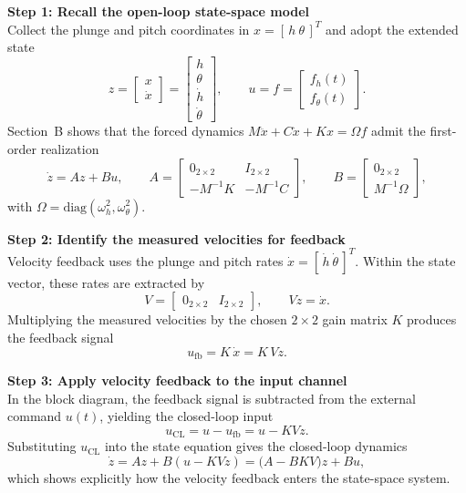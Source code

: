 \documentclass[12pt]{article}
\begin{document}
\begin{stepbox}
\textbf{Step 1: Recall the open-loop state-space model}\\[0.5em]
Collect the plunge and pitch coordinates in $x = [\,h \ \theta\,]^T$ and adopt the extended state
\[
z = \begin{bmatrix} x \\ \dot{x} \end{bmatrix}
= \begin{bmatrix} h \\ \theta \\ \dot{h} \\ \dot{\theta} \end{bmatrix},
\qquad
u = f = \begin{bmatrix} f_h(t) \\ f_\theta(t) \end{bmatrix}.
\]
Section~B shows that the forced dynamics $M\ddot{x}+C\dot{x}+Kx=\Omega f$ admit the first-order realization
\[
\dot{z} = A z + B u,
\qquad
A = \begin{bmatrix} 0_{2\times2} & I_{2\times2} \\ -M^{-1}K & -M^{-1}C \end{bmatrix},
\qquad
B = \begin{bmatrix} 0_{2\times2} \\ M^{-1}\Omega \end{bmatrix},
\]
with $\Omega = \mathrm{diag}(\omega_h^2,\omega_\theta^2)$.
\end{stepbox}

\begin{stepbox}
\textbf{Step 2: Identify the measured velocities for feedback}\\[0.5em]
Velocity feedback uses the plunge and pitch rates $\dot{x} = [\,\dot{h} \ \dot{\theta}\,]^T$.  Within the state vector, these rates are extracted by
\[
V = \begin{bmatrix} 0_{2\times2} & I_{2\times2} \end{bmatrix},
\qquad
V z = \dot{x}.
\]
Multiplying the measured velocities by the chosen $2\times2$ gain matrix $K$ produces the feedback signal
\[
u_{\text{fb}} = K\,\dot{x} = K\,V z.
\]
\end{stepbox}

\begin{stepbox}
\textbf{Step 3: Apply velocity feedback to the input channel}\\[0.5em]
In the block diagram, the feedback signal is subtracted from the external command $u(t)$, yielding the closed-loop input
\[
u_{\text{CL}} = u - u_{\text{fb}} = u - K V z.
\]
Substituting $u_{\text{CL}}$ into the state equation gives the closed-loop dynamics
\[
\dot{z} = A z + B(u - K V z) = \bigl(A - B K V\bigr) z + B u,
\]
which shows explicitly how the velocity feedback enters the state-space system.
\end{stepbox}
\end{document}
